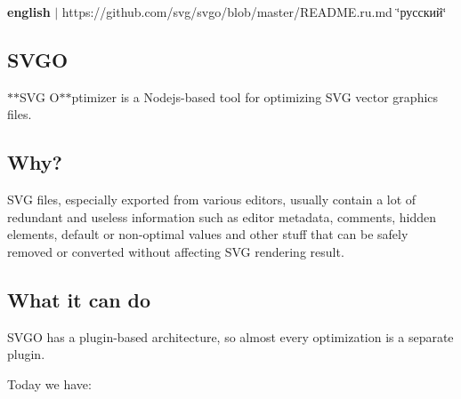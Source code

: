 {\bfseries english} $\vert$ https\+://github.com/svg/svgo/blob/master/\+R\+E\+A\+D\+M\+E.\+ru.\+md \char`\"{}русский\char`\"{} 





\subsection*{S\+V\+GO \href{https://npmjs.org/package/svgo}{\tt } \href{https://gemnasium.com/svg/svgo}{\tt } \href{https://travis-ci.org/svg/svgo}{\tt } \href{https://coveralls.io/r/svg/svgo?branch=master}{\tt }}

$\ast$$\ast$\+S\+VG O$\ast$$\ast$ptimizer is a Nodejs-\/based tool for optimizing S\+VG vector graphics files. 

\subsection*{Why?}

S\+VG files, especially exported from various editors, usually contain a lot of redundant and useless information such as editor metadata, comments, hidden elements, default or non-\/optimal values and other stuff that can be safely removed or converted without affecting S\+VG rendering result.

\subsection*{What it can do}

S\+V\+GO has a plugin-\/based architecture, so almost every optimization is a separate plugin.

Today we have\+:

